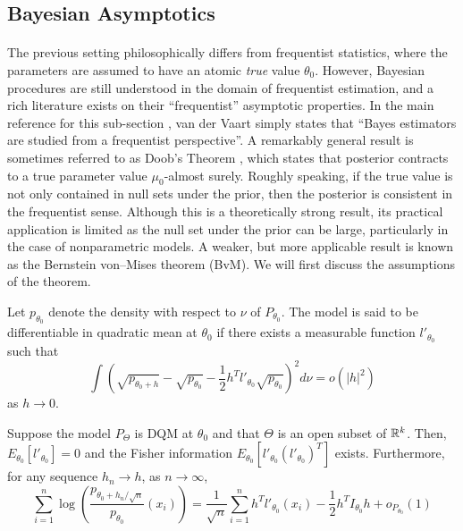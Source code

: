 \subsection{Bayesian Asymptotics}

\paragraph{} The previous setting philosophically differs from frequentist statistics, where the parameters are assumed to have an atomic \textit{true} value $\theta_0$. However, Bayesian procedures are still understood in the domain of frequentist estimation, and a rich literature exists on their ``frequentist'' asymptotic properties. In the main reference for this sub-section \cite{Asymptotics:2000}, van der Vaart simply states that ``Bayes estimators are studied from a frequentist perspective''. A remarkably general result is sometimes referred to as Doob's Theorem \cite{Doob::1949}, which states that posterior contracts to a true parameter value $\mu_0$-almost surely. Roughly speaking, if the true value is not only contained in null sets under the prior, then the posterior is consistent in the frequentist sense. Although this is a theoretically strong result, its practical application is limited as the null set under the prior can be large, particularly in the case of nonparametric models. A weaker, but more applicable result is known as the Bernstein von--Mises theorem (BvM). We will first discuss the assumptions of the theorem. 


\begin{definition}
	Let $p_{\theta_0}$ denote the density with respect to $\nu$ of $P_{\theta_0}$. The model is said to be differentiable in quadratic mean at $\theta_0$ if there exists a measurable function $l'_{\theta_0}$ such that
	\begin{equation}
	\int \left(\sqrt{p_{\theta_0 + h}} - \sqrt{p_{\theta_0}} - \frac{1}{2}h^T l'_{\theta_0} \sqrt{p_{\theta_0}} \right)^2 d\nu = o(|h|^2)
	\end{equation}
	as $h \to 0$. 
\end{definition}

\begin{proposition}
	\label{lan}
	Suppose the model $P_{\Theta}$ is DQM at $\theta_0$ and that $\Theta$ is an open subset of $\mathbb{R}^k$. Then, $E_{\theta_0}[l'_{\theta_0}] = 0$ and the Fisher information $E_{\theta_0}[l'_{\theta_0}(l'_{\theta_0})^{T}]$ exists. Furthermore, for any sequence $h_n \to h$, as $n \to \infty$,
	\begin{equation}
	\sum_{i=1}^n \log\left( \frac{p_{\theta_0 + h_n/\sqrt{n}}}{p_{\theta_0}} (x_i) \right) = \frac{1}{\sqrt{n}}\sum_{i=1}^n h^T l'_{\theta_0}(x_i) - \frac{1}{2}h^TI_{\theta_0}h + o_{P_{\theta_0}}(1)
	\end{equation}
\end{proposition}

